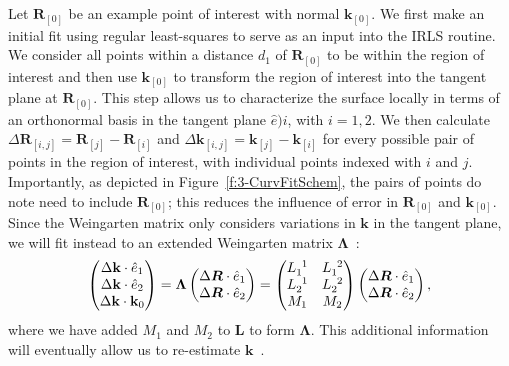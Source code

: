 Let $\mathbf{R}_{[0]}$ be an example point of interest with normal $\mathbf{k}_{[0]}$.
We first make an initial fit using regular least-squares to serve as an input into the IRLS routine.
We consider all points within a distance $d_1$ of $\mathbf{R}_{[0]}$ to be within the region of interest and then use $\mathbf{k}_{[0]}$ to transform the region of interest into the tangent plane at $\mathbf{R}_{[0]}$.
This step allows us to characterize the surface locally in terms of an orthonormal basis in the tangent plane $\hat{e})i$, with $i = 1,2$.
We then calculate $\Delta \mathbf{R}_{[i,j]} = \mathbf{R}_{[j]}-\mathbf{R}_{[i]}$ and $\Delta \mathbf{k}_{[i,j]} = \mathbf{k}_{[j]}-\mathbf{k}_{[i]}$ for every possible pair of points in the region of interest, with individual points indexed with $i$ and $j$.
Importantly, as depicted in Figure~\ref{f:3-CurvFitSchem}, the pairs of points do note need to include $\mathbf{R}_{[0]}$; this reduces the influence of error in $\mathbf{R}_{[0]}$ and $\mathbf{k}_{[0]}$.
Since the Weingarten matrix only considers variations in $\mathbf{k}$ in the tangent plane, we will fit instead to an extended Weingarten matrix $\bm{\Lambda}$~\cite{RN31,RN32}:
\begin{equation}
\begin{pmatrix}
\Delta \mathbf{k} \cdot \hat{e}_1 \\
\Delta \mathbf{k} \cdot \hat{e}_2 \\
\Delta \mathbf{k} \cdot \mathbf{k}_0
\end{pmatrix}
=
\bm{\Lambda}
\begin{pmatrix}
\Delta \bm{R} \cdot \hat{e}_1 \\
\Delta \bm{R} \cdot \hat{e}_2
\end{pmatrix}
=
\begin{pmatrix}
\tensor{L}{_1^1} & \tensor{L}{_1^2} \\
\tensor{L}{_2^1} & \tensor{L}{_2^2} \\
M_{1} & M_{2}
\end{pmatrix}
\begin{pmatrix}
\Delta \bm{R} \cdot \hat{e}_1 \\
\Delta \bm{R} \cdot \hat{e}_2
\end{pmatrix},
\label{e:3-Kfit2}
\end{equation}
where we have added $M_1$ and $M_2$ to $\mathbf{L}$ to form $\bm{\Lambda}$.
This additional information will eventually allow us to re-estimate $\mathbf{k}$~\cite{RN31}.
